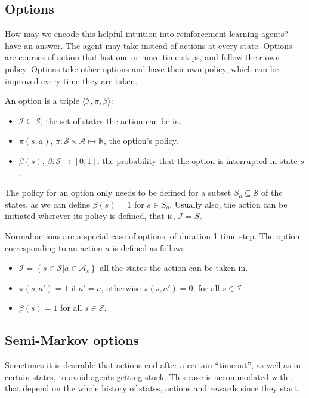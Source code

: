 \subsection{Options}

How may we encode this helpful intuition into reinforcement learning agents?
\citet{sutton1999between} have an answer. The agent may take
 instead of actions at every state. Options are courses of
action that last one or more time steps, and follow their own policy. Options take
other options and have their own policy, which can be improved every time they
are taken.

An option is a triple $\langle \mathcal{I}, \pi, \beta \rangle$:
\begin{itemize}
  \item $\mathcal{I} \subseteq \mathcal{S}$, the set of states the action can be
     in.
  \item $\pi(s, a)$, $\pi : \mathcal{S} \times \mathcal{A} \mapsto \mathbb{R}$,
the option's policy.
  \item $\beta(s)$, $\beta : \mathcal{S} \mapsto [0, 1]$, the probability that
the option is interrupted in state $s$.
\end{itemize}

The policy for an option only needs to be defined for a subset $S_o \subseteq
\mathcal{S}$ of the states, as we can define $\beta(s) = 1$ for $s \in S_o$.
Usually also, the action can be initiated wherever its policy is defined, that
is, $\mathcal{I} = S_o$

Normal actions are a special case of options, of duration 1 time step. The
option corresponding to an action $a$ is defined as follows:
\begin{itemize}
  \item $\mathcal{I} = \left\{ s \in \mathcal{S} | a \in \mathcal{A}_s \right\}$
  all the states the action can be taken in.
  \item $\pi(s, a') = 1$ if $a'=a$, otherwise $\pi(s, a') = 0$; for all
$s\in\mathcal{I}$.
  \item $\beta(s) = 1$ for all $s\in\mathcal{S}$.
\end{itemize}

\subsection{Semi-Markov options}
Sometimes it is desirable that actions end after a certain ``timeout'', as well
as in certain states, to avoid agents getting stuck. This case is accommodated
with , that depend on the whole history of
states, actions and rewards since they start.

